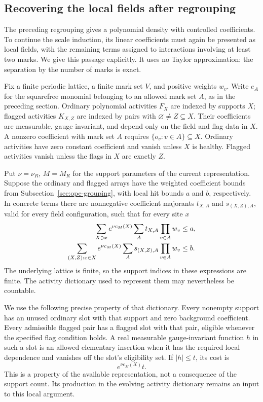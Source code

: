 \subsection{Recovering the local fields after regrouping}
\label{sec:ope-singletons}
The preceding regrouping gives a polynomial density with controlled
coefficients. To continue the scale induction, its linear coefficients
must again be presented as local fields, with the remaining terms
assigned to interactions involving at least two marks. We give this
passage explicitly. It uses no Taylor approximation: the separation
by the number of marks is exact.

Fix a finite periodic lattice, a finite mark set $V$, and positive
weights $w_v$. Write $e_A$ for the squarefree monomial belonging to
an allowed mark set $A$, as in the preceding section. Ordinary
polynomial activities $F_X$ are indexed by supports $X$; flagged
activities $K_{X,Z}$ are indexed by pairs with
$\varnothing\ne Z\subseteq X$. Their coefficients are measurable,
gauge invariant, and depend only on the field and flag data in $X$.
A nonzero coefficient with mark set $A$ requires
$\{o_v:v\in A\}\subseteq X$. Ordinary activities have zero constant
coefficient and vanish unless $X$ is healthy. Flagged activities vanish
unless the flags in $X$ are exactly $Z$.

Put $\nu=\nu_R$, $M=M_R$ for the support parameters of the current
representation. Suppose the ordinary and flagged arrays have the
weighted coefficient bounds from Subsection~\ref{sec:ope-grouping}, with
local hit bounds $a$ and $b$, respectively. In concrete terms there
are nonnegative coefficient majorants $t_{X,A}$ and $s_{(X,Z),A}$,
valid for every field configuration, such that for every site $x$
\begin{align}
 \sum_{X\ni x}e^{\nu c_M(X)}
       \sum_A t_{X,A}\prod_{v\in A}w_v&\le a,\label{eq:ope-single-hit}\\
 \sum_{(X,Z):x\in X}e^{\nu c_M(X)}
       \sum_A s_{(X,Z),A}\prod_{v\in A}w_v&\le b.\notag
\end{align}
The underlying lattice is finite, so the support indices in these
expressions are finite. The activity dictionary used to represent
them may nevertheless be countable.

We use the following precise property of that dictionary. Every
nonempty support has an unused ordinary slot with that support and
zero background coefficient. Every admissible flagged pair has a
flagged slot with that pair, eligible whenever the specified flag
condition holds. A real measurable gauge-invariant function $h$ in
such a slot is an allowed elementary insertion when it has the
required local dependence and vanishes off the slot's eligibility
set. If $|h|\le t$, its cost is
\[
                 e^{\nu c_M(X)}t.
\]
This is a property of the available representation, not a consequence
of the support count. Its production in the evolving activity
dictionary remains an input to this local argument.

